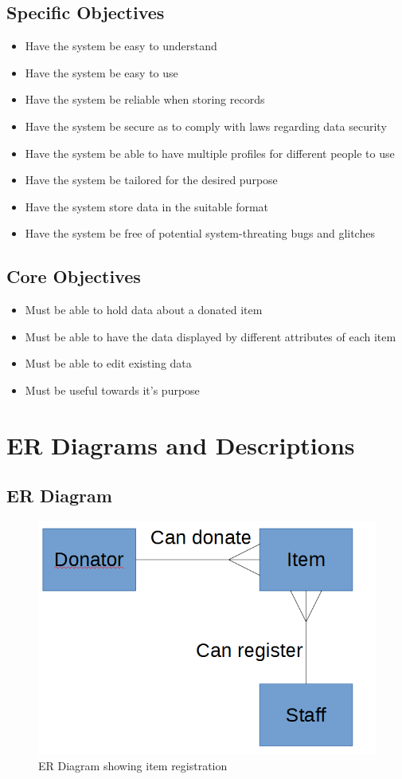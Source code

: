 \subsection{Specific Objectives}
\begin{itemize}
    \item Have the system be easy to understand
    \item Have the system be easy to use
    \item Have the system be reliable when storing records
	\item Have the system be secure as to comply with laws regarding data security
	\item Have the system be able to have multiple profiles for different people to use
	\item Have the system be tailored for the desired purpose
	\item Have the system store data in the suitable format
	\item Have the system be free of potential system-threating bugs and glitches
\end{itemize}
\subsection{Core Objectives}
\begin{itemize}
    \item Must be able to hold data about a donated item
    \item Must be able to have the data displayed by different attributes of each item
    \item Must be able to edit existing data
	\item Must be useful towards it's purpose
\end{itemize}

\section{ER Diagrams and Descriptions}

\subsection{ER Diagram}
\begin{figure}[H]
    \includegraphics[width=\textwidth]{ERDiagram.png}
    \caption{ER Diagram showing item registration} \label{fig:ER Diagram}
\end{figure}
